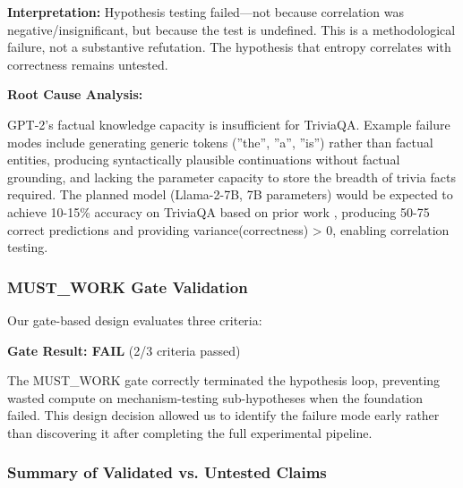 \textbf{Interpretation:} Hypothesis testing failed---not because correlation was negative/insignificant, but because the test is undefined. This is a methodological failure, not a substantive refutation. The hypothesis that entropy correlates with correctness remains untested.

\textbf{Root Cause Analysis:}

GPT-2's factual knowledge capacity is insufficient for TriviaQA. Example failure modes include generating generic tokens (''the'', ''a'', ''is'') rather than factual entities, producing syntactically plausible continuations without factual grounding, and lacking the parameter capacity to store the breadth of trivia facts required. The planned model (Llama-2-7B, 7B parameters) would be expected to achieve 10-15\% accuracy on TriviaQA based on prior work \citep{Roberts2020}, producing 50-75 correct predictions and providing variance(correctness) > 0, enabling correlation testing.

\subsubsection{MUST\_WORK Gate Validation}

Our gate-based design evaluates three criteria:

\begin{table}[htbp]
\centering
{}
\end{table}

\textbf{Gate Result: FAIL} (2/3 criteria passed)

The MUST\_WORK gate correctly terminated the hypothesis loop, preventing wasted compute on mechanism-testing sub-hypotheses when the foundation failed. This design decision allowed us to identify the failure mode early rather than discovering it after completing the full experimental pipeline.

\subsubsection{Summary of Validated vs. Untested Claims}

